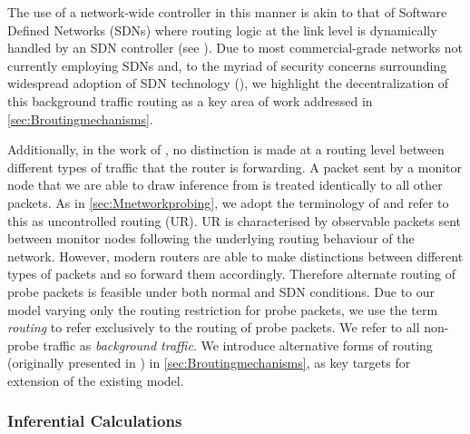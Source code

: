 The use of a network-wide controller in this manner is akin to that of Software Defined Networks (SDNs) where routing logic at the link level is dynamically handled by an SDN controller (see \cite{kreutz_software-defined_2015}). Due to most commercial-grade networks not currently employing SDNs and, to the myriad of security concerns surrounding widespread adoption of SDN technology (\cite{wood_scalable_2021}), we highlight the decentralization of this background traffic routing as a key area of work addressed in \cref{sec:Broutingmechanisms}.\par
Additionally, in the work of \cite{barnes_stochastic_2020}, no distinction is made at a routing level between different types of traffic that the router is forwarding. A packet sent by a monitor node that we are able to draw inference from is treated identically to all other packets. As in \cref{sec:Mnetworkprobing}, we adopt the terminology of \cite{he_network_2021} and refer to this as uncontrolled routing (UR). UR is characterised by observable packets sent between monitor nodes following the underlying routing behaviour of the network. However, modern routers are able to make distinctions between different types of packets and so forward them accordingly. Therefore alternate routing of probe packets is feasible under both normal and SDN conditions. Due to our model varying only the routing restriction for probe packets, we use the term \textit{routing} to refer exclusively to the routing of probe packets. We refer to all non-probe traffic as \textit{background traffic}. We introduce alternative forms of routing (originally presented in \cite{he_network_2021}) in \cref{sec:Broutingmechanisms}, as key targets for extension of the existing model.

\subsubsection*{Inferential Calculations}
\label{sssec:Iinferentialcalculations}

